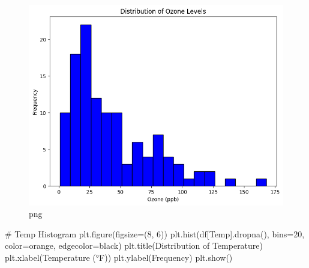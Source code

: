 \documentclass[
  letterpaper,
  DIV=11,
  numbers=noendperiod]{scrreprt}
\newenvironment{Shaded}{\begin{snugshade}}{\end{snugshade}}
\newcommand{\CommentTok}[1]{\textcolor[rgb]{0.37,0.37,0.37}{#1}}
\newcommand{\DecValTok}[1]{\textcolor[rgb]{0.68,0.00,0.00}{#1}}
\newcommand{\NormalTok}[1]{\textcolor[rgb]{0.00,0.23,0.31}{#1}}
\newcommand{\OperatorTok}[1]{\textcolor[rgb]{0.37,0.37,0.37}{#1}}
\newcommand{\StringTok}[1]{\textcolor[rgb]{0.13,0.47,0.30}{#1}}
\begin{document}
\begin{figure}[H]

{\centering \includegraphics{week4_baruga_python_files/week4_baruga_python_6_0.png}

}

\caption{png}

\end{figure}%

\begin{Shaded}
\begin{Highlighting}[]
\CommentTok{\# Temp Histogram}
\NormalTok{plt.figure(figsize}\OperatorTok{=}\NormalTok{(}\DecValTok{8}\NormalTok{, }\DecValTok{6}\NormalTok{))}
\NormalTok{plt.hist(df[}\StringTok{\textquotesingle{}Temp\textquotesingle{}}\NormalTok{].dropna(), bins}\OperatorTok{=}\DecValTok{20}\NormalTok{, color}\OperatorTok{=}\StringTok{\textquotesingle{}orange\textquotesingle{}}\NormalTok{, edgecolor}\OperatorTok{=}\StringTok{\textquotesingle{}black\textquotesingle{}}\NormalTok{)}
\NormalTok{plt.title(}\StringTok{\textquotesingle{}Distribution of Temperature\textquotesingle{}}\NormalTok{)}
\NormalTok{plt.xlabel(}\StringTok{\textquotesingle{}Temperature (°F)\textquotesingle{}}\NormalTok{)}
\NormalTok{plt.ylabel(}\StringTok{\textquotesingle{}Frequency\textquotesingle{}}\NormalTok{)}
\NormalTok{plt.show()}
\end{Highlighting}
\end{Shaded}
\end{document}
